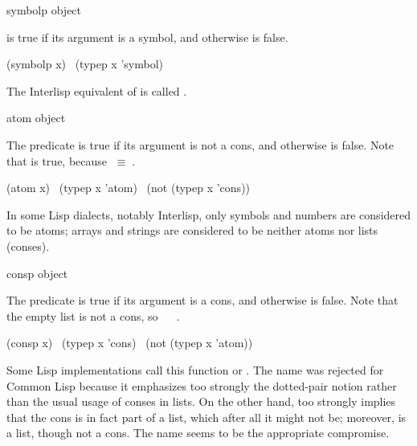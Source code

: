 \begin{defun}[Function]
symbolp object

 is true if its argument is a symbol,
and otherwise is false.
\begin{lisp}
(symbolp x) \EQ\ (typep x 'symbol)
\end{lisp}

\beforenoterule
\begin{incompatibility}
The Interlisp equivalent of  is
called .
\end{incompatibility}
\afternoterule
\end{defun}

\begin{defun}[Function]
atom object

The predicate  is true if its argument is not a cons,
and otherwise is false.
Note that  is true, because {\emptylist}$\;\equiv\;${\nil}.
\begin{lisp}
(atom x) \EQ\ (typep x 'atom) \EQ\ (not (typep x 'cons))
\end{lisp}

\beforenoterule
\begin{incompatibility}
In some Lisp dialects, notably Interlisp,
only symbols and numbers are considered to be atoms; arrays
and strings are considered to be neither atoms nor lists (conses).
\end{incompatibility}
\afternoterule
\end{defun}

\begin{defun}[Function]
consp object

The predicate  is true if its argument is a cons,
and otherwise is false.
Note that the empty list is not a cons, so
 \EQ\  \EV\ {\nil}.
\begin{lisp}
(consp x) \EQ\ (typep x 'cons) \EQ\ (not (typep x 'atom))
\end{lisp}

\beforenoterule
\begin{incompatibility}
Some Lisp implementations call this function
 or .  The name  was rejected for Common Lisp
because it emphasizes too strongly the dotted-pair notion rather than the
usual usage of conses in lists.  On the other hand,  too strongly
implies that the cons is in fact part of a list, which after all it might
not be; moreover, {\emptylist} is a list, though not a cons.
The name  seems to be the appropriate compromise.
\end{incompatibility}
\afternoterule
\end{defun}

